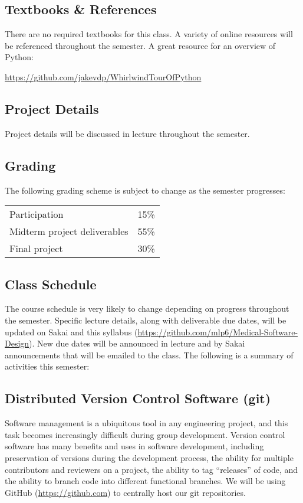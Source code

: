 \subsection*{Textbooks \& References}
There are no required textbooks for this class.  A variety of online resources will be referenced throughout the semester.  A great resource for an overview of Python:\\
\centerline{\url{https://github.com/jakevdp/WhirlwindTourOfPython}}

\subsection*{Project Details}
Project details will be discussed in lecture throughout the semester.

\subsection*{Grading}
The following grading scheme is subject to change as the semester progresses:

\begin{center}
\begin{tabular}{ll}
Participation                           & 15\% \\
Midterm project deliverables            & 55\% \\
Final project                           & 30\% \\
\end{tabular}
\end{center}

\newpage

\subsection*{Class Schedule}
The course schedule is very likely to change depending on progress throughout
the semester. Specific lecture details, along with deliverable due dates, will
be updated on Sakai and this syllabus
(\url{https://github.com/mlp6/Medical-Software-Design}). New due dates will be
announced in lecture and by Sakai announcements that will be emailed to the
class.  The following is a summary of activities this semester:



\subsection*{Distributed Version Control Software (git)}
Software management is a ubiquitous tool in any engineering project, and this
task becomes increasingly difficult during group development. Version control
software has many benefits and uses in software development, including
preservation of versions during the development process, the ability for
multiple contributors and reviewers on a project, the ability to tag
``releases'' of code, and the ability to branch code into different functional
branches.  We will be using GitHub (\url{https://github.com}) to centrally host
our git repositories.

